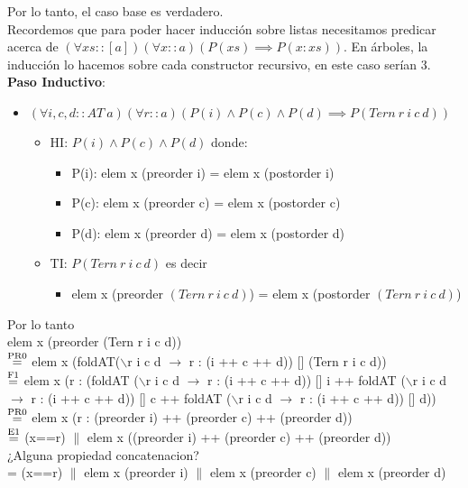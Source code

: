 \documentclass{article}
\begin{document}
Por lo tanto, el caso base es verdadero. \\
Recordemos que para poder hacer inducción sobre listas necesitamos predicar acerca de $(\forall xs::[a])(\forall x ::a) (P(xs) \implies P(x:xs))$. En árboles, la inducción lo hacemos sobre cada constructor recursivo, en este caso serían 3. \\
\textbf{Paso Inductivo}: 
\begin{itemize}
    \item $(\forall i, c, d:: AT \ a)(\forall r::a)(P(i) \land P(c) \land P(d) \implies P(Tern \ r \ i \ c \ d))$
    \begin{itemize}
        \item HI: $P(i) \land P(c) \land P(d)$ donde: 
        \begin{itemize}
            \item P(i): elem x (preorder i) = elem x (postorder i)
            \item P(c): elem x (preorder c) = elem x (postorder c)
            \item P(d): elem x (preorder d) = elem x (postorder d)
        \end{itemize}
        \item TI: $P(Tern \ r \ i \ c \ d)$ es decir
        \begin{itemize}
        \item elem x (preorder $(Tern \ r \ i \ c \ d)$) = elem x (postorder $(Tern \ r \ i \ c \ d)$)
        \end{itemize}
    \end{itemize}
\end{itemize}
Por lo tanto \\ 
elem x (preorder (Tern r i c d)) \\ 
$\stackrel{\text{PR0}}{=}$ elem x (foldAT($\backslash$r i c d $\rightarrow$ r : (i ++ c ++ d)) [] (Tern r i c d)) \\ 
$\stackrel{\text{F1}}{=}$ elem x (r : (foldAT ($\backslash$r i c d $\rightarrow$ r : (i ++ c ++ d)) [] i ++ foldAT ($\backslash$r i c d $\rightarrow$ r : (i ++ c ++ d)) [] c ++ foldAT ($\backslash$r i c d $\rightarrow$ r : (i ++ c ++ d)) [] d)) \\ 
$\stackrel{\text{PR0}}{=}$ elem x (r : (preorder i) ++ (preorder c) ++ (preorder d)) \\
$\stackrel{\text{E1}}{=}$ (x==r) $\|$ elem x ((preorder i) ++ (preorder c) ++ (preorder d)) \\
¿Alguna propiedad concatenacion? \\
= (x==r) $\|$ elem x (preorder i) $\|$ elem x (preorder c) $\|$ elem x (preorder d)
\end{document}
